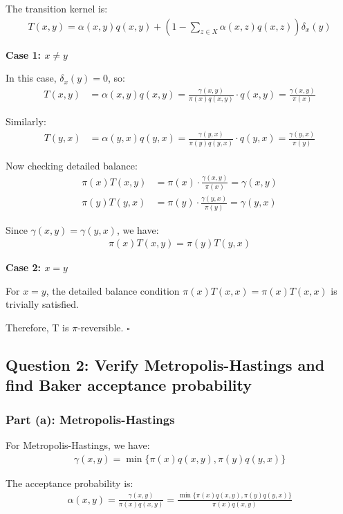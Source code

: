 \documentclass[11pt,a4paper]{article}
\begin{document}
The transition kernel is:
\begin{align}
T(x,y) = \alpha(x,y)q(x,y) + \left(1 - \sum_{z \in X} \alpha(x,z)q(x,z)\right)\delta_x(y)
\end{align}

\textbf{Case 1: $x \neq y$}

In this case, $\delta_x(y) = 0$, so:
\begin{align}
T(x,y) &= \alpha(x,y)q(x,y) = \frac{\gamma(x,y)}{\pi(x)q(x,y)} \cdot q(x,y) = \frac{\gamma(x,y)}{\pi(x)}
\end{align}

Similarly:
\begin{align}
T(y,x) &= \alpha(y,x)q(y,x) = \frac{\gamma(y,x)}{\pi(y)q(y,x)} \cdot q(y,x) = \frac{\gamma(y,x)}{\pi(y)}
\end{align}

Now checking detailed balance:
\begin{align}
\pi(x)T(x,y) &= \pi(x) \cdot \frac{\gamma(x,y)}{\pi(x)} = \gamma(x,y)\\
\pi(y)T(y,x) &= \pi(y) \cdot \frac{\gamma(y,x)}{\pi(y)} = \gamma(y,x)
\end{align}

Since $\gamma(x,y) = \gamma(y,x)$, we have:
\begin{align}
\pi(x)T(x,y) = \pi(y)T(y,x)
\end{align}

\textbf{Case 2: $x = y$}

For $x = y$, the detailed balance condition $\pi(x)T(x,x) = \pi(x)T(x,x)$ is trivially satisfied.

Therefore, T is $\pi$-reversible. $\square$

\subsection{Question 2: Verify Metropolis-Hastings and find Baker acceptance probability}

\subsubsection{Part (a): Metropolis-Hastings}

For Metropolis-Hastings, we have:
\begin{align}
\gamma(x,y) = \min\{\pi(x)q(x,y), \pi(y)q(y,x)\}
\end{align}

The acceptance probability is:
\begin{align}
\alpha(x,y) = \frac{\gamma(x,y)}{\pi(x)q(x,y)} = \frac{\min\{\pi(x)q(x,y), \pi(y)q(y,x)\}}{\pi(x)q(x,y)}
\end{align}
\end{document}

